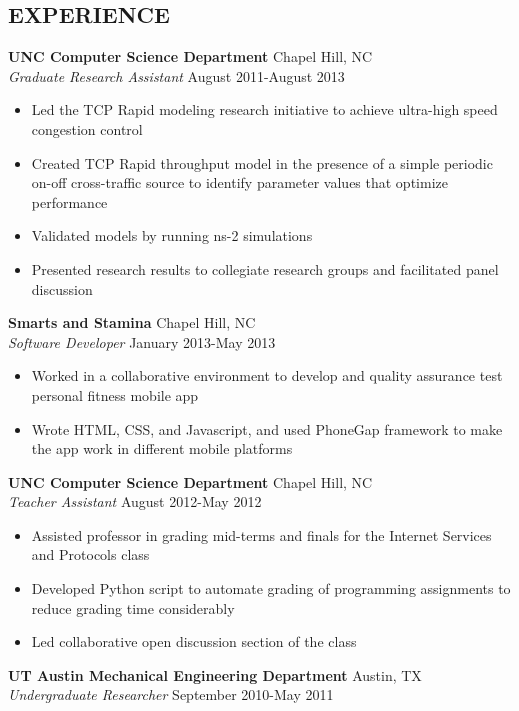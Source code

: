 \documentclass[line,margin]{res}
\begin{document}
\begin{resume}
\section{EXPERIENCE} 
  {\bf UNC Computer Science Department} \hfill Chapel Hill, NC \\
  \emph{Graduate Research Assistant} \hfill August 2011-August 2013
  \begin{itemize} \itemsep -2pt
    \item Led the TCP Rapid modeling research initiative to achieve 
    ultra-high speed congestion control
    \item Created TCP Rapid throughput model in the presence of a simple 
    periodic on-off cross-traffic source to identify parameter values that 
    optimize performance
    \item Validated models by running ns-2 simulations
    \item Presented research results to collegiate research groups and 
    facilitated panel discussion
  \end{itemize}
  {\bf Smarts and Stamina} \hfill Chapel Hill, NC \\
  \emph{Software Developer} \hfill January 2013-May 2013
  \begin{itemize} \itemsep -2pt
    \item Worked in a collaborative environment to develop and quality 
    assurance test personal fitness mobile app
    \item Wrote HTML, CSS, and Javascript, and used PhoneGap framework to make 
    the app work in different mobile platforms
  \end{itemize}
  {\bf UNC Computer Science Department} 
  \hfill Chapel Hill, NC \\
  \emph{Teacher Assistant} \hfill August 2012-May 2012
  \begin{itemize} \itemsep -2pt
    \item Assisted professor in grading mid-terms and finals for the Internet 
    Services and Protocols class
    \item Developed Python script to automate grading of programming 
    assignments to reduce grading time considerably
    \item Led collaborative open discussion section of the class
  \end{itemize}
  {\bf UT Austin Mechanical Engineering Department} \hfill Austin, TX \\
  \emph{Undergraduate Researcher} \hfill September 2010-May 2011
  \begin{itemize} \itemsep -2pt

\end{itemize}
\end{resume}
\end{document}

